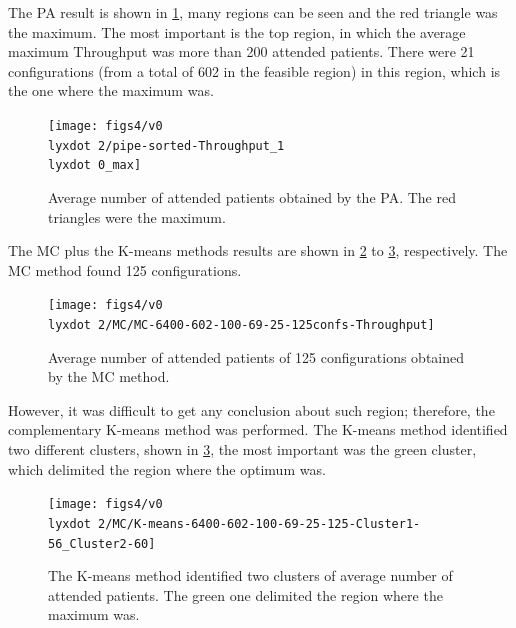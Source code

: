 \documentclass[11pt]{article} %
\begin{document}
The PA result is shown in \ref{subfig:pipe16-2}, many regions can
be seen and the red triangle was the maximum. The most important is
the top region, in which the average maximum Throughput was more than
200 attended patients. There were 21 configurations (from a total
of 602 in the feasible region) in this region, which is the one where
the maximum was.
\begin{figure}[H]
\centering{}\texttt{[image: figs4/v0\\lyxdot 2/pipe-sorted-Throughput\_1\\lyxdot 0\_max]}\caption{Average number of attended patients obtained by the PA. The red triangles
were the maximum.\label{subfig:pipe16-2}}
\end{figure}


The MC plus the K-means methods results are shown in \ref{subfig:mc16-2}
to \ref{subfig:km16-2}, respectively. The MC method found 125 configurations.
\begin{figure}[H]
\centering{}\texttt{[image: figs4/v0\\lyxdot 2/MC/MC-6400-602-100-69-25-125confs-Throughput]}\caption{Average number of attended patients of 125 configurations obtained
by the MC method. \label{subfig:mc16-2}}
\end{figure}
However, it was difficult to get any conclusion about such region;
therefore, the complementary K-means method was performed. The K-means
method identified two different clusters, shown in \ref{subfig:km16-2},
the most important was the green cluster, which delimited the region
where the optimum was.
\begin{figure}[H]
\begin{centering}
\texttt{[image: figs4/v0\\lyxdot 2/MC/K-means-6400-602-100-69-25-125-Cluster1-56\_Cluster2-60]}
\par\end{centering}

\caption{The K-means method identified two clusters of average number of attended
patients. The green one delimited the region where the maximum was.\label{subfig:km16-2}}
\end{figure}

\end{document}
